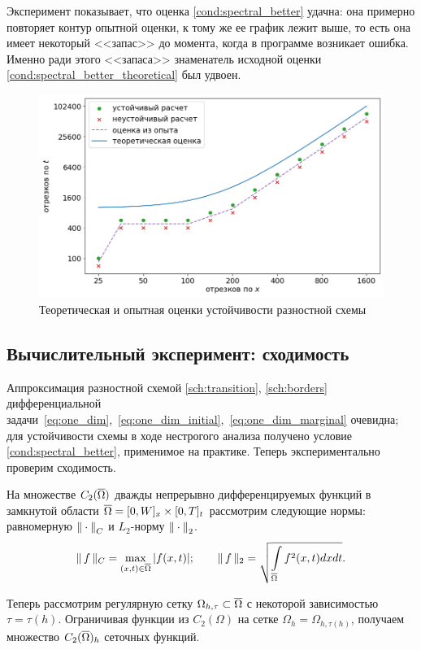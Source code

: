 Эксперимент показывает, что оценка \eqref{cond:spectral_better} удачна: она примерно повторяет контур опытной оценки, к тому же ее график лежит выше, то есть она имеет некоторый <<запас>> до момента, когда в программе возникает ошибка. Именно ради этого <<запаса>> знаменатель исходной оценки  \eqref{cond:spectral_better_theoretical} был удвоен.

\begin{figure}[!t]
	\centering
	\includegraphics[width=\textwidth]{figures/stability_bounds.png}
	\vspace{-0.7cm}
	\caption{Теоретическая и опытная оценки устойчивости разностной схемы}
	\label{fig:stability_bounds}
\end{figure}


\subsection{Вычислительный эксперимент: сходимость}

Аппроксимация разностной схемой \eqref{sch:transition}, \eqref{sch:borders} дифференциальной задачи~\eqref{eq:one_dim},~\eqref{eq:one_dim_initial},~\eqref{eq:one_dim_marginal} очевидна; для устойчивости схемы в ходе нестрогого анализа получено условие \eqref{cond:spectral_better}, применимое на практике. Теперь экспериментально проверим сходимость.

На множестве $C_2({\overline{\Omega}})$ дважды непрерывно дифференцируемых функций в замкнутой области ${\overline{\Omega}} = [0, W]_x \times [0, T]_t$ рассмотрим следующие нормы: равномерную ${\| \cdot \|}_C$ и $L_2$-норму ${\| \cdot \|}_2$.
$$\| \, f \, \|_C = \max \limits_{(x, t) \in {\overline{\Omega}}} |f(x, t)|; \qquad \| \, f \, \|_2 = \sqrt{\int \limits_{{\overline{\Omega}}} f^2(x, t) dx dt} {\text{.}}$$

Теперь рассмотрим регулярную сетку $\Omega_{h, \tau} \subset {\overline{\Omega}}$ с некоторой зависимостью $\tau = \tau(h)$. Ограничивая функции из $C_2(\Omega)$ на сетке $\Omega_h = \Omega_{h, \tau(h)}$, получаем множество $C_2({\overline{\Omega}})_h$ сеточных функций.

